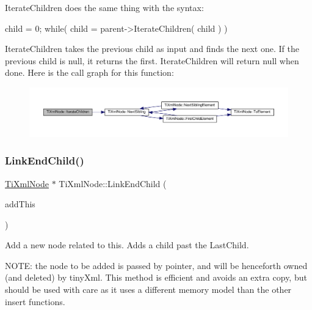 Iterate\+Children does the same thing with the syntax\+: \begin{DoxyVerb}    child = 0;
    while( child = parent->IterateChildren( child ) )
\end{DoxyVerb}


Iterate\+Children takes the previous child as input and finds the next one. If the previous child is null, it returns the first. Iterate\+Children will return null when done. Here is the call graph for this function\+:
\nopagebreak
\begin{figure}[H]
\begin{center}
\leavevmode
\includegraphics[width=350pt]{classTiXmlNode_a67c3a02b797f08d9a31b2553661257e1_cgraph}
\end{center}
\end{figure}
\mbox{\label{classTiXmlNode_a1a881212554b759865f6cac79a851d38}} 
\subsubsection{\texorpdfstring{Link\+End\+Child()}{LinkEndChild()}}
{\footnotesize\ttfamily \hyperlink{classTiXmlNode}{Ti\+Xml\+Node} $\ast$ Ti\+Xml\+Node\+::\+Link\+End\+Child (\begin{DoxyParamCaption}\item[{\hyperlink{classTiXmlNode}{Ti\+Xml\+Node} $\ast$}]{add\+This }\end{DoxyParamCaption})}

Add a new node related to this. Adds a child past the Last\+Child.

N\+O\+TE\+: the node to be added is passed by pointer, and will be henceforth owned (and deleted) by tiny\+Xml. This method is efficient and avoids an extra copy, but should be used with care as it uses a different memory model than the other insert functions.

